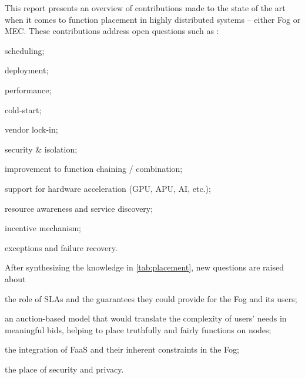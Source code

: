 \documentclass[11pt]{sdm}
\begin{document}
This report presents an overview of contributions made to the state of the art when it comes to function placement in highly distributed systems -- either Fog or \gls{MEC}. These contributions address open questions such as \cite{kjorveziroski_iot_2021,xie_when_2021}:
\begin{enumerate*}[(a)]
	\item scheduling;
	\item deployment;
	\item performance;
	\item cold-start;
	\item vendor lock-in;
	\item security \& isolation;
	\item improvement to function chaining / combination;
	\item support for hardware acceleration (\gls{GPU}, \gls{APU}, \gls{AI}, etc.);
	\item resource awareness and service discovery;
	\item incentive mechanism;
	\item exceptions and failure recovery.
\end{enumerate*}
After synthesizing the knowledge in \cref{tab:placement}, new questions are raised about
\begin{enumerate*}[(i)]
	\item the role of \glspl{SLA} and the guarantees they could provide for the Fog and its users;
	\item an auction-based model that would translate the complexity of users' needs in meaningful bids, helping to place truthfully and fairly functions on nodes;
	\item the integration of \gls{FaaS} and their inherent constraints in the Fog;
	\item the place of security and privacy.
\end{enumerate*}
\printbibliography
\end{document}
